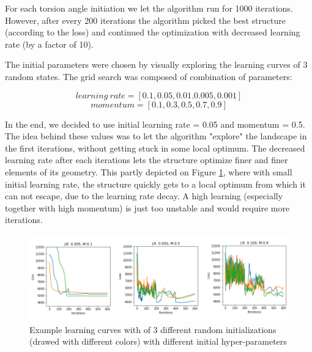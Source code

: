 For each torsion angle initiation we let the algorithm run for 1000 iterations. However, after every 200 iterations the algorithm picked the best structure (according to the loss) and continued the optimization with decreased learning rate (by a factor of 10).

The initial parameters were chosen by visually exploring the learning curves of 3 random states. The grid search was composed of combination of parameters:

$$learning~rate = [0.1, 0.05, 0.01. 0.005, 0.001]$$
$$momentum = [0.1, 0.3, 0.5, 0.7, 0.9]$$

In the end, we decided to use initial learning rate = 0.05 and momentum = 0.5. The idea behind these values was to let the algorithm "explore" the landscape in the first iterations, without getting stuck in some local optimum. The decreased learning rate after each iterations lets the structure optimize finer and finer elements of its geometry. This partly depicted on Figure \ref{fig:learning_curves}, where with small initial learning rate, the structure quickly gets to a local optimum from which it can not escape, due to the learning rate decay. A high learning (especially together with high momentum) is just too unstable and would require more iterations. 

\begin{figure}
    \centering
    \includegraphics[width=\linewidth]{imgs_tomas/learning_curves.png}
    \caption{Example learning curves with of 3 different random initializations (drawed with different colors) with different initial hyper-parameters}
    \label{fig:learning_curves}
\end{figure}

